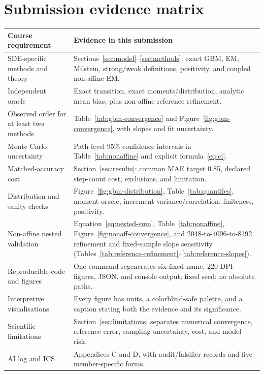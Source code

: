 \documentclass[11pt,a4paper]{article}
\theoremstyle{definition}
\theoremstyle{remark}
\begin{document}
\section{Submission evidence matrix}
\begin{longtable}{p{}p{}}
\toprule
\textbf{Course requirement} & \textbf{Evidence in this submission}\\
\midrule
SDE-specific methods and theory & Sections~\ref{sec:model}--\ref{sec:methods}:
exact GBM, EM, Milstein, strong/weak definitions, positivity, and coupled
non-affine EM.\\
Independent oracle & Exact transition, exact moments/distribution, analytic
mean bias, plus non-affine reference refinement.\\
Observed order for at least two methods & Table~\ref{tab:gbm-convergence} and
Figure~\ref{fig:gbm-convergence}, with slopes and fit uncertainty.\\
Monte Carlo uncertainty & Path-level 95\% confidence intervals in
Table~\ref{tab:nonaffine} and explicit formula~\eqref{eq:ci}.\\
Matched-accuracy cost & Section~\ref{sec:results}: common MAE target 0.85,
declared step-count cost, exclusions, and limitation.\\
Distribution and sanity checks & Figure~\ref{fig:gbm-distribution},
Table~\ref{tab:quantiles}, moment oracle, increment variance/correlation,
finiteness, positivity.\\
Non-affine nested validation & Equation~\eqref{eq:nested-sum},
Table~\ref{tab:nonaffine}, Figure~\ref{fig:nonaff-convergence}, and
2048-to-4096-to-8192 refinement and fixed-sample slope sensitivity
(Tables~\ref{tab:reference-refinement}--\ref{tab:reference-slopes}).\\
Reproducible code and figures & One command regenerates six fixed-name,
220-DPI figures, JSON, and console output; fixed seed; no absolute paths.\\
Interpretive visualisations & Every figure has units, a colorblind-safe palette,
and a caption stating both the evidence and its significance.\\
Scientific limitations & Section~\ref{sec:limitations} separates numerical
convergence, reference error, sampling uncertainty, cost, and model risk.\\
AI log and ICS & Appendices C and D, with audit/falsifier records and five
member-specific forms.\\
\bottomrule
\end{longtable}
\end{document}
